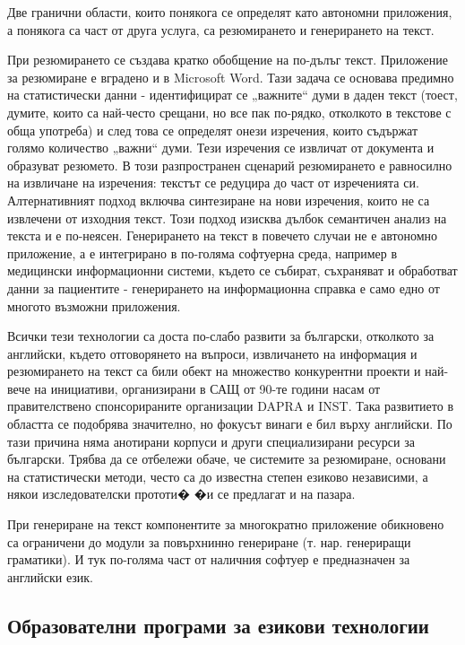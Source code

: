 \begin{multicols}{2}
Две гранични области, които понякога се определят като автономни приложения, а понякога са част от друга услуга, са резюмирането и генерирането на текст. 

При резюмирането се създава кратко обобщение на по-дълъг текст. Приложение за резюмиране е вградено и в Microsoft Word. Тази задача се основава предимно на статистически данни - идентифицират се „важните“ думи в даден текст (тоест, думите, които са най-често срещани, но все
 пак по-рядко, отколкото в текстове с обща употреба) и
 след това се определят онези изречения, които съдържат
 голямо количество „важни“ думи. Тези изречения се извличат от документа и образуват резюмето. В този разпространен сценарий резюмирането е равносилно на извличане на изречения: текстът се редуцира до част от изреченията си.
 Алтернативният подход включва синтезиране на нови
 изречения, които не са извлечени от изходния текст. Този подход изисква дълбок семантичен анализ на текста и е по-неясен. Генерирането на текст в повечето случаи не е автономно приложение, а е интегрирано в по-голяма софтуерна среда, например в медицински информационни системи, където се събират, съхраняват и обработват данни за пациентите - генерирането на информационна справка е само едно от многото възможни приложения.
 
Всички тези технологии са доста по-слабо развити за български, отколкото за английски, където отговорянето на въпроси, извличането на информация
 и резюмирането на текст са били обект на множество конкурентни проекти и най-вече на инициативи, организирани в САЩ от 90-те години насам от правителствено спонсорираните организации DAPRA и INST. Така развитието в областта се подобрява значително, но фокусът винаги е бил върху английски. По тази причина няма анотирани корпуси и други специализирани ресурси за български. Трябва да се отбележи обаче, че системите за резюмиране, основани на статистически методи, често са до известна степен езиково независими, а някои изследователски прототи�
 �и се предлагат и на пазара.

При генериране на текст компонентите за многократно приложение обикновено са
 ограничени до модули за повърхнинно генериране (т. нар. генериращи граматики). И тук по-голяма част от наличния софтуер е предназначен за английски език.

\subsection{Образователни програми за езикови технологии}


\end{multicols}
